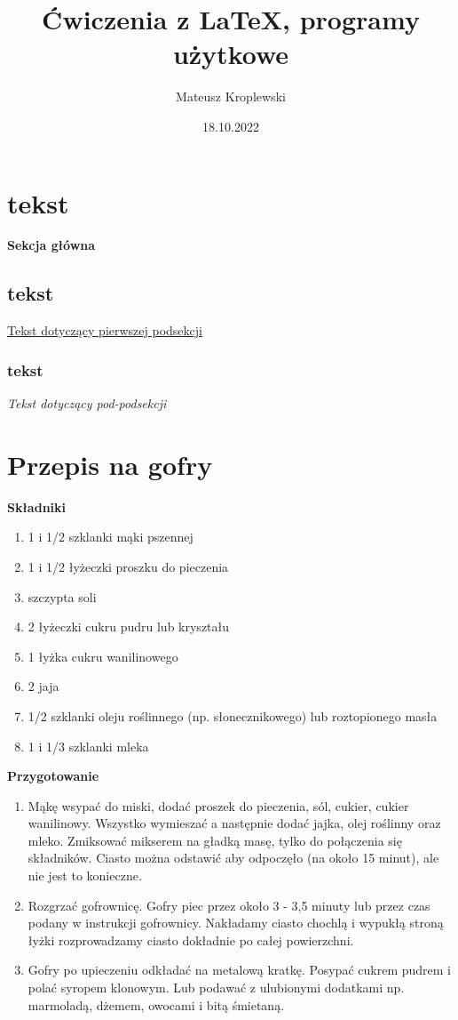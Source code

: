 \documentclass[12pt, a4paper, titlepage]{article}
\title{Ćwiczenia z LaTeX, programy użytkowe}
\author{Mateusz Kroplewski}
\date{18.10.2022}
\begin{document}
\maketitle
\section{tekst}
\textbf{Sekcja główna}
\subsection{tekst}
\underline{Tekst dotyczący pierwszej podsekcji}
\subsubsection{tekst}
\textit{Tekst dotyczący pod-podsekcji}
\newpage
\section{Przepis na gofry}
\textbf{Składniki}
\begin {enumerate}
\item 1 i 1/2 szklanki mąki pszennej
\item 1 i 1/2 łyżeczki proszku do pieczenia
\item szczypta soli
\item 2 łyżeczki cukru pudru lub kryształu
\item 1 łyżka cukru wanilinowego
\item 2 jaja
\item 1/2 szklanki oleju roślinnego (np. słonecznikowego) lub roztopionego masła
\item 1 i 1/3 szklanki mleka

\end {enumerate}
\textbf{Przygotowanie}
\begin{enumerate}[•]
\item Mąkę wsypać do miski, dodać proszek do pieczenia, sól, cukier, cukier wanilinowy. Wszystko wymieszać a następnie dodać jajka, olej roślinny oraz mleko. Zmiksować mikserem na gładką masę, tylko do połączenia się składników. Ciasto można odstawić aby odpoczęło (na około 15 minut), ale nie jest to konieczne.
\item Rozgrzać gofrownicę. Gofry piec przez około 3 - 3,5 minuty lub przez czas podany w instrukcji gofrownicy. Nakładamy ciasto chochlą i wypukłą stroną łyżki rozprowadzamy ciasto dokładnie po całej powierzchni.
\item Gofry po upieczeniu odkładać na metalową kratkę. Posypać cukrem pudrem i polać syropem klonowym. Lub podawać z ulubionymi dodatkami np. marmoladą, dżemem, owocami i bitą śmietaną.

\end{enumerate}
\end{document}
